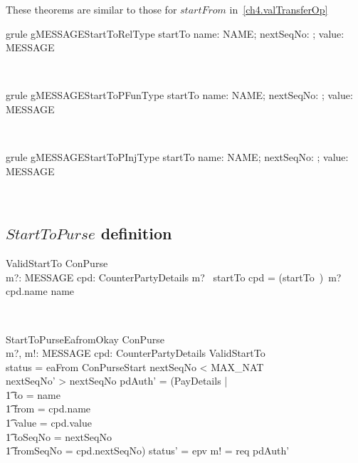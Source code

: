 These theorems are similar to those for $startFrom$ in~\ref{ch4.valTransferOp}
%
\begin{LGRT}
\begin{theorem}{grule gMESSAGEStartToRelType}
   startTo \in  \lblot name: NAME; nextSeqNo: \nat ; value: \nat \rblot  \rel  MESSAGE
\end{theorem}~\end{LGRT}

\begin{LGRT}
\begin{theorem}{grule gMESSAGEStartToPFunType}
   startTo \in  \lblot name: NAME; nextSeqNo: \nat ; value: \nat \rblot  \pfun  MESSAGE
\end{theorem}~\end{LGRT}

\begin{LGRT}
\begin{theorem}{grule gMESSAGEStartToPInjType}
   startTo \in \lblot name: NAME; nextSeqNo: \nat; value: \nat \rblot \pinj MESSAGE
\end{theorem}~\end{LGRT}

\subsection*{$StartToPurse$ definition}

\begin{LSDef}
\begin{schema}{ValidStartTo}
   ConPurse \\
   m?: MESSAGE
   \also
   cpd: CounterPartyDetails
\where
   m? \in \ran~startTo
   \also
   cpd = (startTo~\inv)~m?
   \also
   cpd.name \neq name
\end{schema}~\end{LSDef}

\begin{LSDef}
\begin{schema}{StartToPurseEafromOkay}
   \Delta ConPurse \\
   m?, m!: MESSAGE
   \also
   cpd: CounterPartyDetails
\where
   ValidStartTo \\
   status = eaFrom
   \also
   \Xi ConPurseStart
   \also
   nextSeqNo < MAX\_NAT \\
   nextSeqNo' > nextSeqNo
   \also
   pdAuth' = (\mu PayDetails | \\
      \t1 to = name \\
      \t1 \land from = cpd.name \\
      \t1 \land value = cpd.value \\
      \t1 \land toSeqNo = nextSeqNo \\
      \t1 \land fromSeqNo = cpd.nextSeqNo)
   \also
   status' = epv
   \also
   m! = req pdAuth'
\end{schema}~\end{LSDef}


